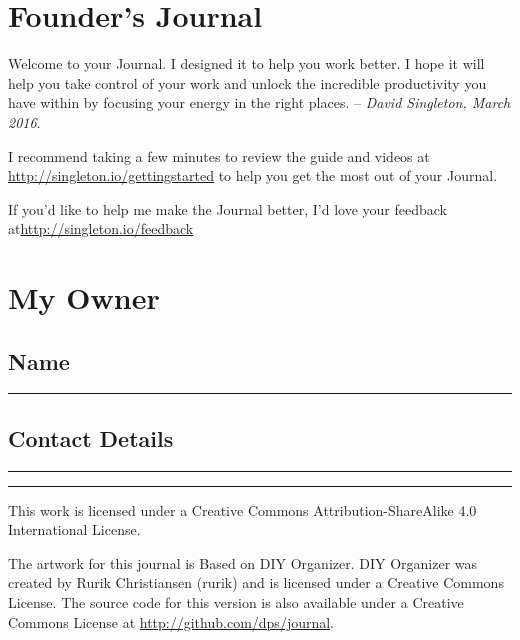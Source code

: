 \section{Founder's Journal}

Welcome to your Journal.  I designed it to help you work better.  I hope it will help you take control of your work and unlock the incredible productivity you have within by focusing your energy in the right places.
-- \textit{David Singleton, March 2016}.
\par
I recommend taking a few minutes to review the guide and videos at \linebreak\url{http://singleton.io/gettingstarted} to help you get the most out of your Journal.
\par

If you'd like to help me make the Journal better, I'd love your feedback at\linebreak \url{http://singleton.io/feedback}


\section{My Owner}

\subsection{Name}
{\color{WriteBgMain}
\rule{\textwidth}{1pt}\par}

\subsection{Contact Details}
{\color{WriteBgMain}
\rule{\textwidth}{1pt}\par
\rule{\textwidth}{1pt}\par}

\pagebreak
This work is licensed under a Creative Commons Attribution-ShareAlike 4.0 International License.

The artwork for this journal is Based on DIY Organizer.  DIY Organizer was created by Rurik Christiansen (rurik) and is licensed under a Creative Commons License.  The source code for this version is also available under a Creative Commons License at \url{http://github.com/dps/journal}.

\pagebreak
